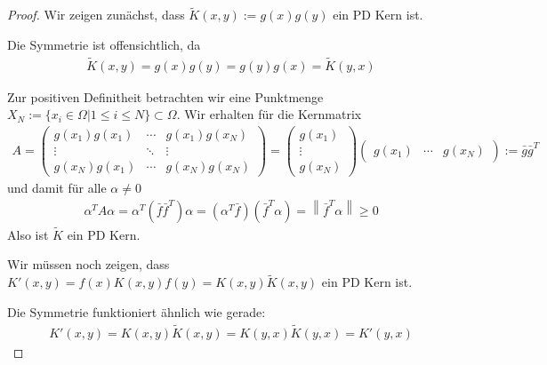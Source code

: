 \begin{proof}
Wir zeigen zunächst, dass $\tilde{K}(x,y):= g(x)g(y)$ ein \ac{PD} Kern ist.

Die Symmetrie ist offensichtlich, da
\begin{align*}
\tilde{K}(x,y)= g(x)g(y) = g(y) g(x) = \tilde{K}(y,x)
\end{align*}

Zur positiven Definitheit betrachten wir eine Punktmenge $X_N := \{x_i \in \Omega| 1 \le i \le N \}\subset \Omega$. Wir erhalten für die Kernmatrix
\begin{align*}
A = 
\begin{pmatrix}
g(x_1)g(x_1) & \cdots & g(x_1)g(x_N) \\ 
\vdots & \ddots & \vdots \\ 
g(x_N)g(x_1) & \cdots & g(x_N)g(x_N)
\end{pmatrix} 
=
\begin{pmatrix}
g(x_1) \\ 
\vdots \\ 
g(x_N)
\end{pmatrix}
\begin{pmatrix}
g(x_1) & \cdots & g(x_N)
\end{pmatrix}
:= \bar{g}\bar{g}^T
\end{align*}
und damit für alle $\alpha \neq 0$
\begin{align*}
\alpha^T A \alpha = \alpha^T \left(\bar{f}\bar{f}^T\right)\alpha = \left(\alpha^T \bar{f}\right)\left(\bar{f}^T \alpha\right) = \left\| \bar{f}^T\alpha\right\| \geq 0
\end{align*}
Also ist $\tilde{K}$ ein \ac{PD} Kern.

Wir müssen noch zeigen, dass $K'(x,y) = f(x) K(x,y) f(y) = K(x,y) \tilde{K}(x,y)$ ein \ac{PD} Kern ist.

Die Symmetrie funktioniert ähnlich wie gerade:
\begin{align*}
K'(x,y) = K(x,y) \tilde{K}(x,y) = K(y,x) \tilde{K}(y,x) = K'(y,x)
\end{align*}


\end{proof}
